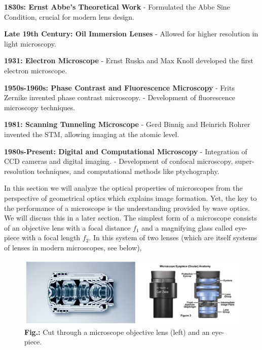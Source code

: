 \documentclass[
  a4paper,
]{book}
\begin{document}
\begin{tcolorbox}
\textbf{1830s: Ernst Abbe's Theoretical Work} - Formulated the Abbe Sine
Condition, crucial for modern lens design.

\textbf{Late 19th Century: Oil Immersion Lenses} - Allowed for higher
resolution in light microscopy.

\textbf{1931: Electron Microscope} - Ernst Ruska and Max Knoll developed
the first electron microscope.

\textbf{1950s-1960s: Phase Contrast and Fluorescence Microscopy} - Frits
Zernike invented phase contrast microscopy. - Development of
fluorescence microscopy techniques.

\textbf{1981: Scanning Tunneling Microscope} - Gerd Binnig and Heinrich
Rohrer invented the STM, allowing imaging at the atomic level.

\textbf{1980s-Present: Digital and Computational Microscopy} -
Integration of CCD cameras and digital imaging. - Development of
confocal microscopy, super-resolution techniques, and computational
methods like ptychography.

\end{tcolorbox}

In this section we will analyze the optical properties of microscopes
from the perspective of geometrical optics which explains image
formation. Yet, the key to the performance of a microscope is the
understanding provided by wave optics. We will discuss this in a later
section. The simplest form of a microscope consists of an objective lens
with a focal distance \(f_1\) and a magnifying glass called eye-piece
with a focal length \(f_2\). In this system of two lenses (which are
itself systems of lenses in modern microscopes, see below),

\begin{figure}[H]

{\centering \includegraphics[width=0.6\linewidth,height=\textheight,keepaspectratio]{geometrical-optics/img/microscopy_lenses.png}

}

\caption{\textbf{Fig.:} Cut through a microscope objective lens (left)
and an eye-piece.}

\end{figure}%
\end{document}
